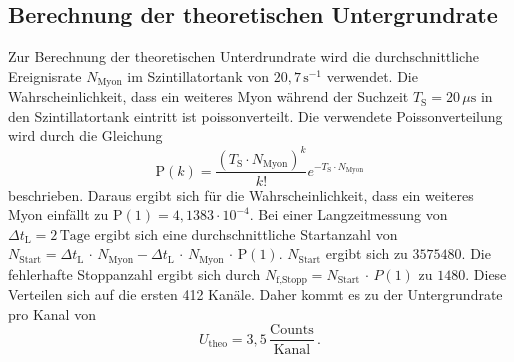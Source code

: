 \subsection{Berechnung der theoretischen Untergrundrate}
Zur Berechnung der theoretischen Unterdrundrate wird die durchschnittliche Ereignisrate $N_{\text{Myon}}$ im Szintillatortank von 
$20,7\,\unit{\second}^{-1}$ verwendet. Die Wahrscheinlichkeit, dass ein weiteres Myon während der Suchzeit $T_{\text{S}} = 20 \,\unit{\mu\second}$
in den Szintillatortank eintritt ist poissonverteilt. Die verwendete Poissonverteilung wird durch die Gleichung 
\begin{equation}
	\text{P}(k) = \frac{(T_{\text{S}} \cdot N_{\text{Myon}})^k}{k!} e^{- T_{\text{S}} \cdot N_{\text{Myon}}}
	\label{eqn:Poisson}
\end{equation}
beschrieben. Daraus ergibt sich für die Wahrscheinlichkeit, dass ein weiteres Myon einfällt zu $\text{P}(1) = 4,1383 \cdot 10^{-4}$.
Bei einer Langzeitmessung von $\Delta t_{\text{L}} = 2 \, \text{Tage} $ ergibt sich eine durchschnittliche Startanzahl von 
$N_{\text{Start}} = \Delta t_{\text{L}} \,\cdot \, N_{\text{Myon}} - \Delta t_{\text{L}} \, \cdot \, N_{\text{Myon}} \, \cdot \, \text{P}(1)$. 
$N_{\text{Start}}$ ergibt sich zu $3575480$. Die fehlerhafte Stoppanzahl ergibt sich durch 
$N_{\text{f,Stopp}} = N_{\text{Start}} \, \cdot \, P(1)$ zu $1480$. Diese Verteilen sich auf die ersten 412 Kanäle. Daher kommt es 
zu der Untergrundrate pro Kanal von $$U_{\text{theo}} = 3,5 \, \frac{\text{Counts}}{\text{Kanal}}\,.$$


